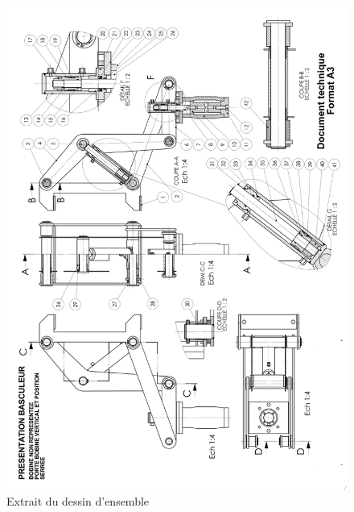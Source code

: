 
\begin{figure}
\vspace{-0.5cm}
\begin{center}
 \includegraphics[width=\linewidth]{img/fig08.png}
\end{center}
\caption{Extrait du dessin d'ensemble}
\label{fig08}
\end{figure}

